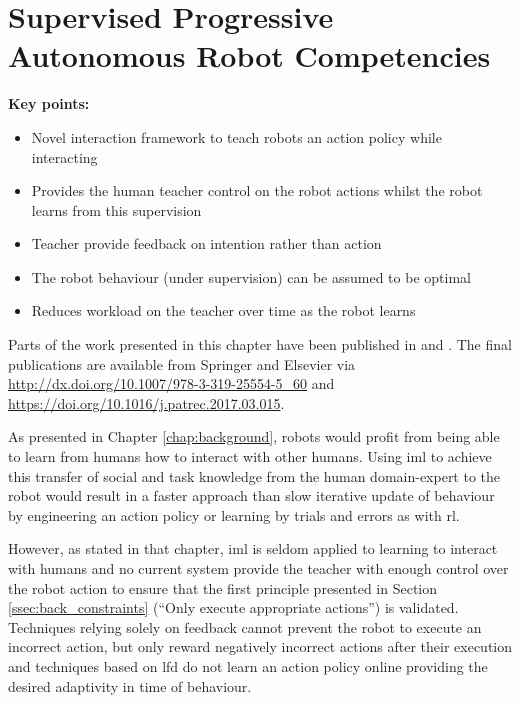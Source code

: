\chapter{Supervised Progressive Autonomous Robot Competencies}\label{chap:sparc}

\begin{framed}
	\textbf{Key points:}
	
	\begin{itemize}
		\item Novel interaction framework to teach robots an action policy while interacting
		\item Provides the human teacher control on the robot actions whilst the robot learns from this supervision
		\item Teacher provide feedback on intention rather than action
		\item The robot behaviour (under supervision) can be assumed to be optimal
		\item Reduces workload on the teacher over time as the robot learns
	\end{itemize}
\end{framed}

Parts of the work presented in this chapter have been published in \cite{senft2015sparc} and \cite{senft2017supervised}. The final publications are available from Springer and Elsevier via \url{http://dx.doi.org/10.1007/978-3-319-25554-5_60} and \url{https://doi.org/10.1016/j.patrec.2017.03.015}.

\newpage

As presented in Chapter \ref{chap:background}, robots would profit from being able to learn from humans how to interact with other humans. Using \gls{iml} to achieve this transfer of social and task knowledge from the human domain-expert to the robot would result in a faster approach than slow iterative update of behaviour by engineering an action policy or learning by trials and errors as with \gls{rl}.

However, as stated in that chapter, \gls{iml} is seldom applied to learning to interact with humans and no current system provide the teacher with enough control over the robot action to ensure that the first principle presented in Section \ref{ssec:back_constraints} (``Only execute appropriate actions'') is validated. Techniques relying solely on feedback cannot prevent the robot to execute an incorrect action, but only reward negatively incorrect actions after their execution \citep{senft2017supervised} and techniques based on \gls{lfd} do not learn an action policy online providing the desired adaptivity in time of behaviour.


